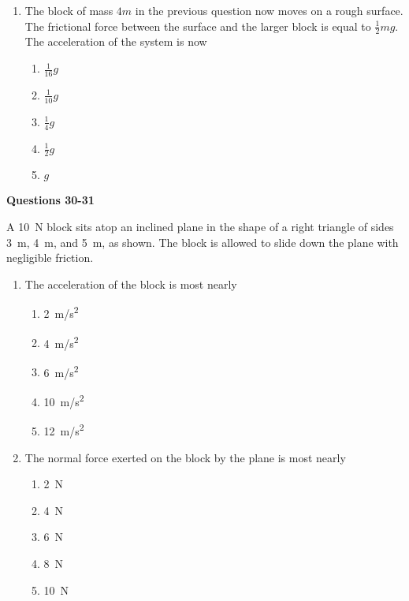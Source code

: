 \documentclass{../../oss-apphys}
\begin{document}
\begin{multicols}{2}
\begin{enumerate}[resume,leftmargin=18pt]
  \item The block of mass $4m$ in the previous question now moves on a rough
    surface. The frictional force between the surface and the larger block is
    equal to $\frac{1}{2}mg$. The acceleration of the system is now
    \begin{enumerate}[noitemsep,topsep=0pt,leftmargin=18pt,label=(\Alph*)]
    \item $\displaystyle\frac{1}{16}g$
    \item $\displaystyle\frac{1}{10}g$
    \item $\displaystyle\frac{1}{4}g$
    \item $\displaystyle\frac{1}{2}g$
    \item $g$
    \end{enumerate}
  \end{enumerate}
  \columnbreak
  
  \textbf{Questions 30-31}

  A \SI{10}{\newton} block sits atop an inclined plane in the shape of a
  right triangle of sides \SI{3}{\metre}, \SI{4}{\metre}, and \SI{5}{\metre},
  as shown. The block is allowed to slide down the plane with negligible
  friction.
  \vspace{-.2in}
  
  \begin{enumerate}[resume,leftmargin=18pt]
  \item The acceleration of the block is most nearly
    \begin{enumerate}[noitemsep,topsep=0pt,leftmargin=18pt,label=(\Alph*)]
    \item\SI{2}{m/s^2}
    \item\SI{4}{m/s^2}
    \item\SI{6}{m/s^2}
    \item\SI{10}{m/s^2}
    \item\SI{12}{m/s^2}
    \end{enumerate}

  \item The normal force exerted on the block by the plane is most nearly
    \begin{enumerate}[noitemsep,topsep=0pt,leftmargin=18pt,label=(\Alph*)]
    \item\SI{2}{\newton}
    \item\SI{4}{\newton}
    \item\SI{6}{\newton}
    \item\SI{8}{\newton}
    \item\SI{10}{\newton}
    \end{enumerate}
    

\end{enumerate}
\end{multicols}
\end{document}
